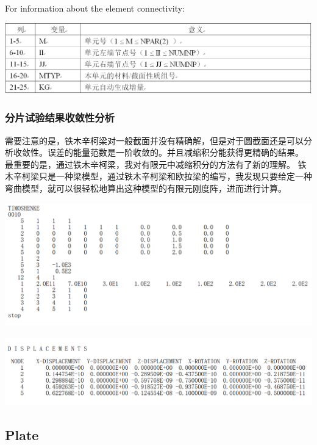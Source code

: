 \documentclass[UTF8]{ctexbook}
\begin{document}
\paragraph{}For information about the element connectivity:
\begin{center}
\includegraphics[width=1.0\textwidth]{beam6.png}
\end{center}
\subsubsection{分片试验结果收敛性分析}
需要注意的是，铁木辛柯梁对一般截面并没有精确解，但是对于圆截面还是可以分析收敛性。误差的能量范数是一阶收敛的。并且减缩积分能获得更精确的结果。
最重要的是，通过铁木辛柯梁，我对有限元中减缩积分的方法有了新的理解。
铁木辛柯梁只是一种梁模型，通过铁木辛柯梁和欧拉梁的编写，我发现只要给定一种弯曲模型，就可以很轻松地算出这种模型的有限元刚度阵，进而进行计算。
\begin{center}
\includegraphics[width=1.0\textwidth]{timoshenko2.png}
\end{center}
\begin{center}
\includegraphics[width=1.0\textwidth]{timoshenko3.png}
\end{center}
\subsection{Plate}
\end{document}
